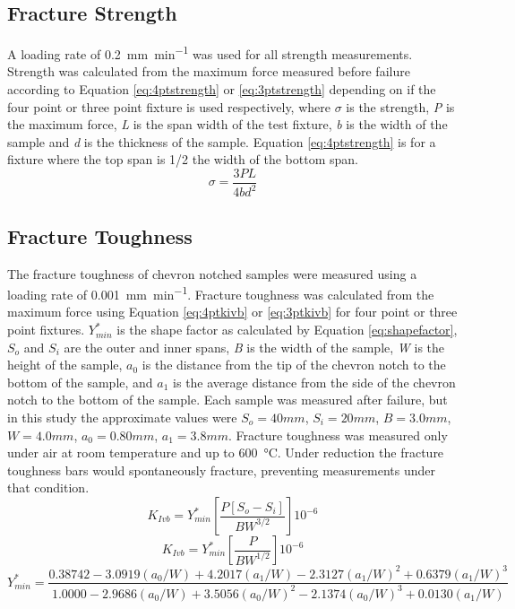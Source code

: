     \subsection{Fracture Strength}
        A loading rate of \SI{0.2}{mm\per\minute} was used for all strength measurements.
        Strength was calculated from the maximum force measured before failure according to Equation \ref{eq:4ptstrength} or \ref{eq:3ptstrength} depending on if the four point or three point fixture is used respectively, where $\sigma{}$ is the strength, \textit{P} is the maximum force, \textit{L} is the span width of the test fixture, \textit{b} is the width of the sample and \textit{d} is the thickness of the sample. Equation \ref{eq:4ptstrength} is for a fixture where the top span is 1/2 the width of the bottom span.\cite{ASTM2008}
        \begin{equation}
            \sigma = \frac{3PL}{4bd^{2}}
            \label{eq:4ptstrength}
        \end{equation}

    \subsection{Fracture Toughness}
        The fracture toughness of chevron notched samples were measured using a loading rate of \SI{0.001}{mm\per\minute}.
        Fracture toughness was calculated from the maximum force using Equation \ref{eq:4ptkivb} or \ref{eq:3ptkivb} for four point or three point fixtures.\cite{ASTM2016a,Wu1984}
        $Y^{*}_{min}$ is the shape factor as calculated by Equation \ref{eq:shapefactor}, $S_o$ and $S_i$ are the outer and inner spans, \textit{B} is the width of the sample, \textit{W} is the height of the sample, $a_0$ is the distance from the tip of the chevron notch to the bottom of the sample, and $a_1$ is the average distance from the side of the chevron notch to the bottom of the sample.
        Each sample was measured after failure, but in this study the approximate values were $S_o = 40 mm$, $S_i = 20 mm$, $B = 3.0 mm$, $W = 4.0 mm$, $a_0 = 0.80 mm$, $a_1 = 3.8 mm$.
        Fracture toughness was measured only under air at room temperature and up to \SI{600}{\celsius}.
        Under reduction the fracture toughness bars would spontaneously fracture, preventing measurements under that condition.
        \begin{equation}
            K_{Ivb} = Y^{*}_{min}  \left [\frac{P[S_o-S_i]}{BW^{3/2}}\right ]10^{-6}
            \label{eq:4ptkivb}
        \end{equation}
        \begin{equation}
            K_{Ivb} = Y^{*}_{min}  \left [\frac{P}{BW^{1/2}}\right ]10^{-6}
            \label{eq:3ptkivb}
        \end{equation}
        \begin{equation}
            Y^{*}_{min} = \frac{0.38742-3.0919(a_0/W)+4.2017(a_1/W)-2.3127(a_1/W)^2+0.6379(a_1/W)^3}{1.0000-2.9686(a_0/W)+3.5056(a_0/W)^2-2.1374(a_0/W)^3+0.0130(a_1/W)}
            \label{eq:shapefactor}
        \end{equation}
